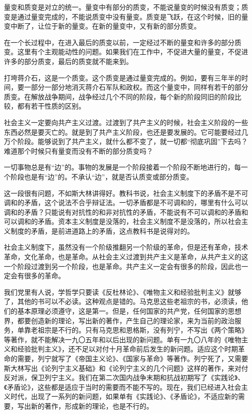 量变和质变是对立的统一。量变中有部分的质变，不能说量变的时候没有质变；质变是通过量变完成的，不能说质变中没有量变。质变是飞跃，在这个时候，旧的量变中断了，让位于新的量变。在新的量变中，又有新的部分质变。

在一个长过程中，在进入最后的质变以前，一定经过不断的量变和许多的部分质变。这里有个主观能动性的问题。如果我们在工作中，不促进大量的量变，不促进许多的部分质变，最后的质变就不能来到。

打垮蒋介石，这是一个质变。这个质变是通过量变完成的。例如，要有三年半的时间，要一部分一部分地消灭蒋介石军队和政权。而这个量变中，同样有若干的部分质变。在解放战争期间，战争经过几个不同的阶段，每个新的阶段同旧的阶段比较，都有若干性质的区别。

社会主义一定要向共产主义过渡。过渡到了共产主义的时候，社会主义阶段的一些东西必然是要灭亡的。就是到了共产主义阶段，也还是要发展的。它可能要经过几万个阶段。能够说到了共产主义，就什么都不变了，就一切都“彻底巩固”下去吗？难道那个时候只有量变而没有不断的部分质变吗？

一切事物总是有“边”的。事物的发展是一个阶段接着一个阶段不断地进行的，每一个阶段也是有“边”的。不承认“边”，就是否认质变或部分质变。

这一段很有问题，不如斯大林讲得好。教科书说，社会主义制度下的矛盾不是不可调和的矛盾，这个说法不合乎辩证法。一切矛盾都是不可调和的，哪里有什么可以调和的矛盾？只能说有对抗性的和非对抗性的矛盾，不能说有不可以调和的矛盾和可以调和的矛盾。资本主义制度是没落的，社会主义制度不是没落的，所以社会主义制度的矛盾，是前进道路上的矛盾，这点教科书是说得对的。

社会主义制度下，虽然没有一个阶级推翻另一个阶级的革命，但是还有革命，技术革命，文化革命，也是革命。从社会主义过渡到共产主义是革命，从共产主义的这一个阶段过渡到另一个阶段，也是革命。共产主义一定会有很多的阶段，因此也一定会有很多的革命。

我们党里有人说，学哲学只要读《反杜林论》、《唯物主义和经验批判主义》就够了，其他的书可以不必读。这种观点是错的。马克思这些老祖宗的书，必须读，他们的基本原理必须遵守，这是第一。但是，任何国家的共产党，任何国家的思想界，都要创造新的理论，写出新的著作，产生自己的理论家，来为当前的政治服务，单靠老祖宗是不行的。只有马克思和恩格斯，没有列宁，不写出《两个策略》等著作，就不能解决一九〇五年和以后出现的新问题。单有一九〇八年的《唯物主义和经验批判主义》，还不足以对付十月革命前后发生的新问题。适应这个时期革命的需要，列宁就写了《帝国主义论》、《国家与革命》等著作。列宁死了，又需要斯大林写出《论列宁主义基础》和《论列宁主义的几个问题》这样的著作，来对付反对派，保卫列宁主义。我们在第二次国内战争末期和抗战初期写了《实践论》、《矛盾论》，这些都是适应于当时的需要而不能不写的。现在，我们已经进入社会主义时代，出现了一系列的新问题，如果单有《实践论》、《矛盾论》，不适应新的需要，写出新的著作，形成新的理论，也是不行的。

